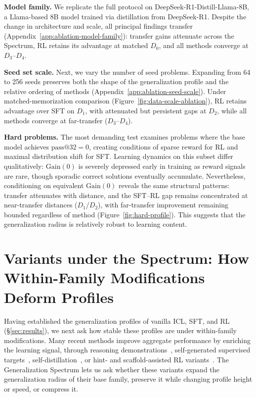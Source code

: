 \documentclass[]{bytedance_seed}
\theoremstyle{plain}
\theoremstyle{definition}
\theoremstyle{remark}
\begin{document}
\textbf{Model family.} We replicate the full protocol on DeepSeek-R1-Distill-Llama-8B, a Llama-based 8B model trained via distillation from DeepSeek-R1. Despite the change in architecture and scale, all principal findings transfer (Appendix~\ref{app:ablation-model-family}): transfer gains attenuate across the Spectrum, RL retains its advantage at matched $D_0$, and all methods converge at $D_3$--$D_4$.

\textbf{Seed set scale.} Next, we vary the number of seed problems. Expanding from 64 to 256 seeds preserves both the shape of the generalization profile and the relative ordering of methods (Appendix~\ref{app:ablation-seed-scale}). Under matched-memorization comparison (Figure~\ref{fig:data-scale-ablation}), RL retains advantage over SFT on $D_1$, with attenuated but persistent gaps at $D_2$, while all methods converge at far-transfer ($D_3$--$D_4$).

\textbf{Hard problems.} The most demanding test examines problems where the base model achieves $\text{pass@32}=0$, creating conditions of sparse reward for RL and maximal distribution shift for SFT. Learning dynamics on this subset differ qualitatively: $\text{Gain}(0)$ is severely depressed early in training as reward signals are rare, though sporadic correct solutions eventually accumulate. Nevertheless, conditioning on equivalent $\text{Gain}(0)$ reveals the same structural patterns: transfer attenuates with distance, and the SFT--RL gap remains concentrated at near-transfer distances ($D_1$/$D_2$), with far-transfer improvement remaining bounded regardless of method (Figure~\ref{fig:hard-profile}).
This suggests that the generalization radius is relatively robust to learning content.




\section{Variants under the Spectrum: How Within-Family Modifications Deform Profiles}
\label{sec:analysis}

Having established the generalization profiles of vanilla ICL, SFT, and RL (\S\ref{sec:results}), we next ask how stable these profiles are under within-family modifications. Many recent methods improve aggregate performance by enriching the learning signal, through reasoning demonstrations~\citep{wei2022chainofthought,zelikman2022star}, self-generated supervised targets~\citep{yuan2023rft}, self-distillation~\citep{opsd2026,sdft2026,sdpo2026}, or hint- and scaffold-assisted RL variants~\citep{li2026questa,ghpo2025,zhang2026bread,zhang2025stephint,wang2026hint,huang2025hintgrpo,kang2025table}. The Generalization Spectrum lets us ask whether these variants expand the generalization radius of their base family, preserve it while changing profile height or speed, or compress it.
\end{document}

